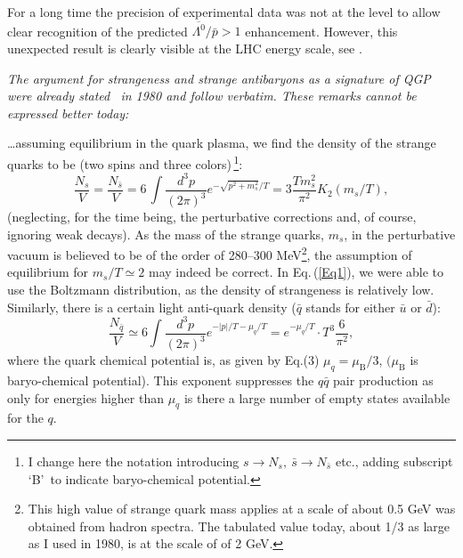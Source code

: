 For a long time the precision of experimental data was not at the level to allow clear recognition of the predicted $\overline{\Lambda^0}/\bar p>1$ enhancement. However, this unexpected result is clearly visible at the LHC energy scale, see .

\noindent \textit{The argument for strangeness and strange antibaryons as a signature of QGP were already stated~\cite{Rafelski:1980rk} in 1980 and follow verbatim. These remarks cannot be expressed better today:}\\[-0.7cm]
%
\begin{mdframed}[linecolor=gray,roundcorner=12pt,backgroundcolor=Dandelion!15,linewidth=1pt,leftmargin=0cm,rightmargin=0cm,topline=true,bottomline=true,skipabove=12pt]\relax%
%
 \ldots assuming equilibrium in the quark plasma,
we find the density of the strange quarks to be (two spins and three colors)\,\footnote{I change here the notation introducing
$ s\to N_s,\ \bar s\to N_{\bar s} $ etc., adding subscript \lq B\rq\ to indicate baryo-chemical potential.}:
\begin{equation}\label{Eq1}\tag{26}
\frac{ N_s} V =\frac{ N_{\bar s}} V =6\,\int \frac{d^3p}{(2\pi)^3}e^{-\sqrt{p^2+m_s^2}/T}=3\frac{Tm_s^2}{\pi^2}K_2(m_s/T),
\end{equation}
(neglecting, for the time being, the perturbative corrections and, of course, ignoring weak decays). As the mass of the strange quarks, $m_s$, in the perturbative vacuum is believed to be of the order of 280--300 MeV\footnote{This high value of strange quark mass applies at a scale of about 0.5 GeV was obtained from hadron spectra. The tabulated value today, about 1/3 as large as I used in 1980, is at the scale of of 2 GeV.}, the assumption of equilibrium for $m_s/T\simeq 2$ may indeed be correct. In Eq.\,(\ref{Eq1}), we were able to use the Boltzmann distribution, as the density of strangeness is relatively low. Similarly, there is a certain light anti-quark density ($\bar q$ stands for either $\bar u$ or $\bar d$):
\begin{equation}\label{Eq2}\tag{27}
\frac{N_{\bar q}}{V}\simeq 6\int \frac{d^3p}{(2\pi)^3}e^{-|p|/T-\mu_q/T}=e^{-\mu_q/T}\cdot T^3 \frac{6}{\pi^2},
\end{equation}
where the quark chemical potential is, as given by Eq.(3) $\mu_q=\mu_\mathrm{B}/3$, $(\mu_\mathrm{B}$ is baryo-chemical potential). This exponent suppresses the $q\bar q$ pair production as only for energies higher than $\mu_q$ is there a large number of empty states available for the $q$. 


\end{mdframed}
